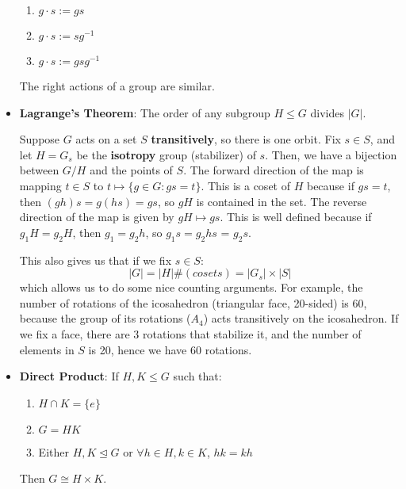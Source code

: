\documentclass[11pt, oneside]{amsart}   	%
\theoremstyle{definition}
\begin{document}
\begin{itemize}
\begin{enumerate}
			\item $g\cdot s := gs$
			
			\item $g\cdot s := sg^{-1}$
			
			\item $g\cdot s := gsg^{-1}$
		
		\end{enumerate}
	
	The right actions of a group are similar. 
	
	\item \textbf{Lagrange's Theorem}: The order of any subgroup $H\leq G$ divides $|G|$.
	
	Suppose $G$ acts on a set $S$ \textbf{transitively}, so there is one orbit. Fix $s\in S$, and let $H = G_s$ be the \textbf{isotropy} group 
	(stabilizer) of $s$. Then, we have a bijection between $G / H$ and the points of $S$. The forward direction of the map is mapping $t\in S$ to
	$t\mapsto\{g\in G : gs = t\}$. This is a coset of $H$ because if $gs = t$, then $(gh)s = g(hs) = gs$, so $gH$ is contained in the set. The reverse 
	direction of the map is given by $gH\mapsto gs$. This is well defined because if $g_1H = g_2H$, then $g_1 = g_2h$, so $g_1s = g_2hs$ = 
	$g_2s$.
	
	This also gives us that if we fix $s\in S$:
	$$
		|G| = |H|\#(cosets) = |G_s|\times|S|
	$$
	which allows us to do some nice counting arguments. For example, the number of rotations of the icosahedron (triangular face, 20-sided) is 
	60, because the group of its rotations ($A_4$) acts transitively on the icosahedron. If we fix a face, there are $3$ rotations that stabilize it, and 
	the number of elements in $S$ is 20, hence we have $60$ rotations.
	
	\item \textbf{Direct Product}: If $H, K\leq G$ such that:
		
		\begin{enumerate}
		
			\item $H\cap K = \{e\}$
			
			\item $G = HK$
			
			\item Either $H, K\trianglelefteq G$ or $\forall h\in H, k\in K$, $hk = kh$
		
		\end{enumerate}
	
	Then $G \cong H\times K$.
		

\end{itemize}
\end{document}
